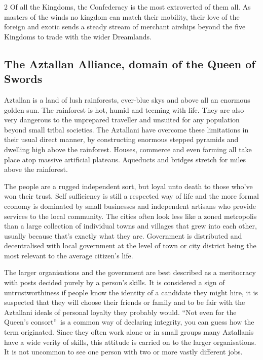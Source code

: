 \begin{multicols}{2}
Of all the Kingdoms, the Confederacy is the most extroverted of them all. As masters of the winds no kingdom can match their mobility, their love of the foreign and exotic sends a steady stream of merchant airships beyond the five Kingdoms to trade with the wider Dreamlands. 

\subsection*{The Aztallan Alliance, domain of the Queen of Swords}

Aztallan is a land of lush rainforests, ever-blue skys and above all an enormous golden sun. The rainforest is hot, humid and teeming with life. They are also very dangerous to the unprepared traveller and unsuited for any population beyond small tribal societies. The Aztallani have overcome these limitations in their usual direct manner, by constructing enormous stepped pyramids and dwelling high above the rainforest. Houses, commerce and even farming all take place atop massive artificial plateaus. Aqueducts and bridges stretch for miles above the rainforest.

The people are a rugged independent sort, but loyal unto death to those who've won their trust. Self sufficiency is still a respected way of life and the more formal economy is dominated by small businesses and independent artisans who provide services to the local community. The cities often look less like a zoned metropolis than a large collection of individual towns and villages that grew into each other, usually because that's exactly what they are. Government is distributed and decentralised with local government at the level of town or city district being the most relevant to the average citizen's life.

The larger organisations and the government are best described as a meritocracy with posts decided purely by a person's skills. It is considered a sign of untrustworthiness if people know the identity of a candidate they might hire, it is suspected that they will choose their friends or family and to be fair with the Aztallani ideals of personal loyalty they probably would. \textquotedblleft Not even for the Queen's consort\textquotedblright\, is a common way of declaring integrity, you can guess how the term originated. Since they often work alone or in small groups many Aztallanis have a wide verity of skills, this attitude is carried on to the larger organisations. It is not uncommon to see one person with two or more vastly different jobs.


\end{multicols}
